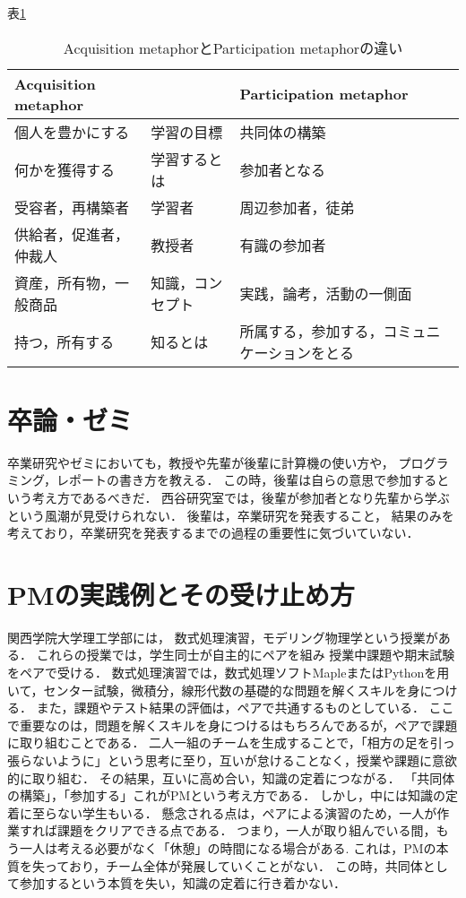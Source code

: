 \documentclass{hissymp}
\begin{document}
表\ref{tab:orgf234d7a}

\begin{table}[htbp]
\caption{\label{tab:orgf234d7a}
Acquisition metaphorとParticipation metaphorの違い}
\centering
\begin{tabular}{|l|l|l|}
\hline
Acquisition metaphor &  & Participation metaphor\\
\hline
個人を豊かにする & 学習の目標 & 共同体の構築\\
何かを獲得する & 学習するとは & 参加者となる\\
受容者，再構築者 & 学習者 & 周辺参加者，徒弟\\
供給者，促進者，仲裁人 & 教授者 & 有識の参加者\\
資産，所有物，一般商品 & 知識，コンセプト & 実践，論考，活動の一側面\\
持つ，所有する & 知るとは & 所属する，参加する，コミュニケーションをとる\\
\hline
\end{tabular}
\end{table}

\section{卒論・ゼミ}
\label{sec:orge1435c0}
卒業研究やゼミにおいても，教授や先輩が後輩に計算機の使い方や，
プログラミング，レポートの書き方を教える．
この時，後輩は自らの意思で参加するという考え方であるべきだ．
西谷研究室では，後輩が参加者となり先輩から学ぶという風潮が見受けられない．
後輩は，卒業研究を発表すること，
結果のみを考えており，卒業研究を発表するまでの過程の重要性に気づいていない．



\section{PMの実践例とその受け止め方}
\label{sec:orga54dd46}
関西学院大学理工学部には，
数式処理演習，モデリング物理学という授業がある．
これらの授業では，学生同士が自主的にペアを組み
授業中課題や期末試験をペアで受ける．
数式処理演習では，数式処理ソフトMapleまたはPythonを用いて，センター試験，微積分，線形代数の基礎的な問題を解くスキルを身につける．
また，課題やテスト結果の評価は，ペアで共通するものとしている．
ここで重要なのは，問題を解くスキルを身につけるはもちろんであるが，ペアで課題に取り組むことである．
二人一組のチームを生成することで，「相方の足を引っ張らないように」という思考に至り，互いが怠けることなく，授業や課題に意欲的に取り組む．
その結果，互いに高め合い，知識の定着につながる．
「共同体の構築」，「参加する」これがPMという考え方である．
しかし，中には知識の定着に至らない学生もいる．
懸念される点は，ペアによる演習のため，一人が作業すれば課題をクリアできる点である．
つまり，一人が取り組んでいる間，もう一人は考える必要がなく「休憩」の時間になる場合がある.
これは，PMの本質を失っており，チーム全体が発展していくことがない．
この時，共同体として参加するという本質を失い，知識の定着に行き着かない．
\end{document}
